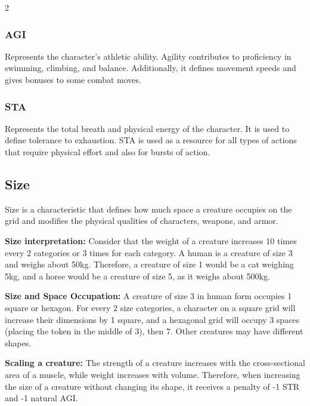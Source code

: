 \begin{multicols}{2}
\subsubsection{AGI}

Represents the character's athletic ability. Agility contributes to proficiency in swimming, climbing, and balance. Additionally, it defines movement speeds and gives bonuses to some combat moves.

\subsubsection{STA}

Represents the total breath and physical energy of the character. It is used to define tolerance to exhaustion. STA is used as a resource for all types of actions that require physical effort and also for bursts of action.

\subsection{Size}

Size is a characteristic that defines how much space a creature occupies on the grid and modifies the physical qualities of characters, weapons, and armor.

\textbf{Size interpretation:} Consider that the weight of a creature increases 10 times every 2 categories or 3 times for each category. A human is a creature of size 3 and weighs about 50kg. Therefore, a creature of size 1 would be a cat weighing 5kg, and a horse would be a creature of size 5, as it weighs about 500kg.

\textbf{Size and Space Occupation: } A creature of size 3 in human form occupies 1 square or hexagon. For every 2 size categories, a character on a square grid will increase their dimensions by 1 square, and a hexagonal grid will occupy 3 spaces (placing the token in the middle of 3), then 7. Other creatures may have different shapes.


\textbf{Scaling a creature:} The strength of a creature increases with the cross-sectional area of a muscle, while weight increases with volume. Therefore, when increasing the size of a creature without changing its shape, it receives a penalty of -1 STR and -1 natural AGI.


\end{multicols}

